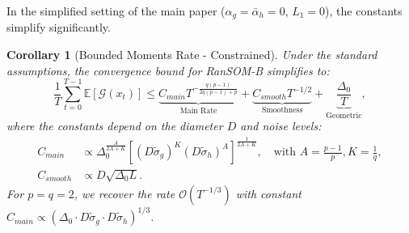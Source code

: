 \documentclass{article}
\theoremstyle{plain}
\newtheorem{corollary}[theorem]{Corollary}
\theoremstyle{definition}
\theoremstyle{remark}
\begin{document}
In the simplified setting of the main paper ($\alpha_g = \bar{\alpha}_h = 0$, $L_1 = 0$), the constants simplify significantly.

\begin{corollary}[Bounded Moments Rate - Constrained]
Under the standard assumptions, the convergence bound for RanSOM-B simplifies to:
\begin{equation}
\label{eq:simple_constrained_rate}
    \frac{1}{T} \sum_{t=0}^{T-1} \mathbb{E}[\mathcal{G}(x_t)] \le \underbrace{C_{main} T^{-\frac{q(p-1)}{2q(p-1)+p}}}_{\text{Main Rate}} + \underbrace{C_{smooth} T^{-1/2}}_{\text{Smoothness}} + \underbrace{\frac{\Delta_0}{T}}_{\text{Geometric}},
\end{equation}
where the constants depend on the diameter $D$ and noise levels:
\begin{align}
    C_{main} &\propto \Delta_0^{\frac{A}{2A+K}} \left[ \left( D \tilde{\sigma}_g \right)^K \left( D \tilde{\sigma}_h \right)^A \right]^{\frac{1}{2A+K}}, \quad \text{with } A=\frac{p-1}{p}, K=\frac{1}{q}, \\
    C_{smooth} &\propto D \sqrt{\Delta_0 L}.
\end{align}
For $p=q=2$, we recover the rate $\mathcal{O}(T^{-1/3})$ with constant $C_{main} \propto (\Delta_0 \cdot D \tilde{\sigma}_g \cdot D \tilde{\sigma}_h)^{1/3}$.
\end{corollary}
\end{document}
